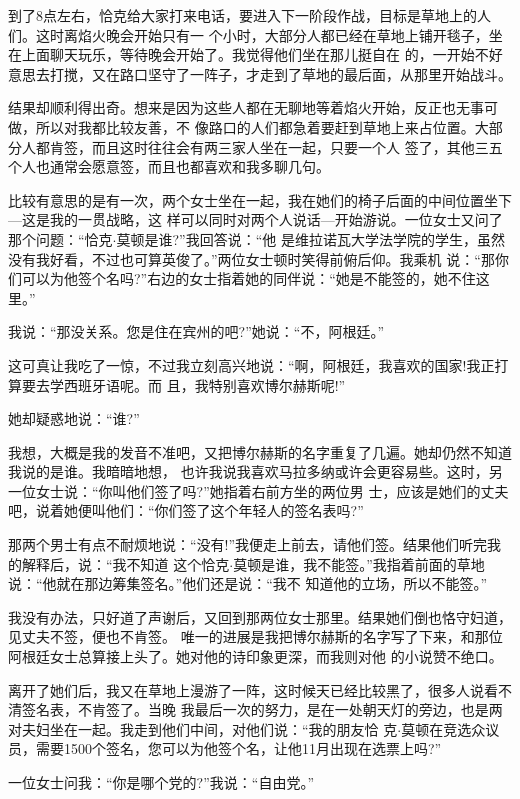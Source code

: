 ﻿\documentclass[11pt]{article}
\begin{document}
到了8点左右，恰克给大家打来电话，要进入下一阶段作战，目标是草地上的人们。这时离焰火晚会开始只有一
个小时，大部分人都已经在草地上铺开毯子，坐在上面聊天玩乐，等待晚会开始了。我觉得他们坐在那儿挺自在
的，一开始不好意思去打搅，又在路口坚守了一阵子，才走到了草地的最后面，从那里开始战斗。

结果却顺利得出奇。想来是因为这些人都在无聊地等着焰火开始，反正也无事可做，所以对我都比较友善，不
像路口的人们都急着要赶到草地上来占位置。大部分人都肯签，而且这时往往会有两三家人坐在一起，只要一个人
签了，其他三五个人也通常会愿意签，而且也都喜欢和我多聊几句。

比较有意思的是有一次，两个女士坐在一起，我在她们的椅子后面的中间位置坐下---这是我的一贯战略，这
样可以同时对两个人说话---开始游说。一位女士又问了那个问题：``恰克$\cdot$莫顿是谁?''我回答说：``他
是维拉诺瓦大学法学院的学生，虽然没有我好看，不过也可算英俊了。''两位女士顿时笑得前俯后仰。我乘机
说：``那你们可以为他签个名吗?''右边的女士指着她的同伴说：``她是不能签的，她不住这里。''

我说：``那没关系。您是住在宾州的吧?''她说：``不，阿根廷。''

这可真让我吃了一惊，不过我立刻高兴地说：``啊，阿根廷，我喜欢的国家!我正打算要去学西班牙语呢。而
且，我特别喜欢博尔赫斯呢!''

她却疑惑地说：``谁?''

我想，大概是我的发音不准吧，又把博尔赫斯的名字重复了几遍。她却仍然不知道我说的是谁。我暗暗地想，
也许我说我喜欢马拉多纳或许会更容易些。这时，另一位女士说：``你叫他们签了吗?''她指着右前方坐的两位男
士，应该是她们的丈夫吧，说着她便叫他们：``你们签了这个年轻人的签名表吗?''

那两个男士有点不耐烦地说：``没有!''我便走上前去，请他们签。结果他们听完我的解释后，说：``我不知道
这个恰克$\cdot$莫顿是谁，我不能签。''我指着前面的草地说：``他就在那边筹集签名。''他们还是说：``我不
知道他的立场，所以不能签。''

我没有办法，只好道了声谢后，又回到那两位女士那里。结果她们倒也恪守妇道，见丈夫不签，便也不肯签。
唯一的进展是我把博尔赫斯的名字写了下来，和那位阿根廷女士总算接上头了。她对他的诗印象更深，而我则对他
的小说赞不绝口。

离开了她们后，我又在草地上漫游了一阵，这时候天已经比较黑了，很多人说看不清签名表，不肯签了。当晚
我最后一次的努力，是在一处朝天灯的旁边，也是两对夫妇坐在一起。我走到他们中间，对他们说：``我的朋友恰
克$\cdot$莫顿在竞选众议员，需要1500个签名，您可以为他签个名，让他11月出现在选票上吗?''

一位女士问我：``你是哪个党的?''我说：``自由党。''
\end{document}
